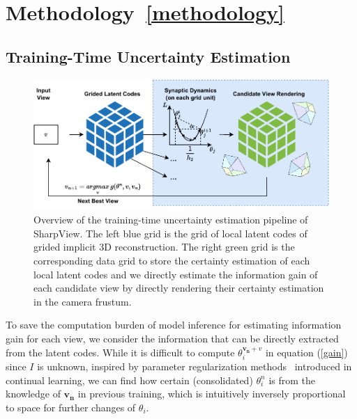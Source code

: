 \section{Methodology~\ref{methodology}}
\subsection{Training-Time Uncertainty Estimation}
\begin{figure}
    \includegraphics{overview.pdf}
    \caption{Overview of the training-time uncertainty estimation pipeline of SharpView. The left blue grid is the grid of local latent codes of grided implicit 3D reconstruction. The right green grid is the corresponding data grid to store the certainty estimation of each local latent codes and we directly estimate the information gain of each candidate view by directly rendering their certainty estimation in the camera frustum.}
    \label{overview}
\end{figure}

To save the computation burden of model inference for estimating information gain for each view, we consider the information that can be directly extracted from the latent codes.
While it is difficult to compute $\theta_i^{\bm{v_n} + v}$ in equation (\ref*{gain}) since $I$ is unknown, inspired by parameter regularization methods~\cite{zenke2017continual} introduced in continual learning, we can find how certain (consolidated) $\theta_i^n$ is from the knowledge of $\bm{v_n}$ in previous training, which is intuitively inversely proportional to space for further changes of $\theta_i$.

